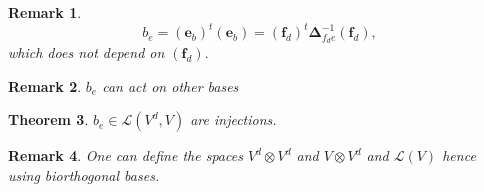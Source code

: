 \documentclass[aps,preprint]{revtex4}
\newtheorem{theorem}{Theorem}
\newtheorem{remark}[theorem]{Remark}
\begin{document}
\begin{remark}
\begin{equation}
b_{e}=\left( \boldsymbol{e}_{b}\right) ^{t}\left( \boldsymbol{e}_{b}\right)
=\left( \boldsymbol{f}_{d}\right) ^{t}\boldsymbol{\Delta }%
_{f_{d}e}^{-1}\left( \boldsymbol{f}_{d}\right) ,
\end{equation}%
which does not depend on $\left( \boldsymbol{f}_{d}\right) .$
\end{remark}

\begin{remark}
$b_{e}$ can act on other bases
\end{remark}

\begin{theorem}
$b_{e}\in \mathcal{L}\left( V^{d},V\right) $ are injections.
\end{theorem}

\begin{remark}
One can define the spaces $V^{d}\otimes V^{d}$ and $V\otimes V^{d}$ and $%
\mathcal{L}\left( V\right) $ hence using biorthogonal bases.
\end{remark}
\end{document}
